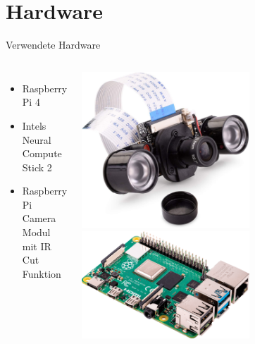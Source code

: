 \section[\thesection \  Hardware]{Hardware}\label{sec:hardware}


\begin{frame}{Verwendete Hardware}
    \begin{columns}[T]

        \begin{itemize}
            \item Raspberry Pi 4
            \item Intels Neural Compute Stick 2
            \item Raspberry Pi Camera Modul mit IR Cut Funktion      
        \end{itemize}
        
        \includegraphics[width=0.6\textwidth]{Bilder/RPiCam.jpg}
        \includegraphics[width=0.6\textwidth]{Bilder/raspberrypi_4.png}

    \end{columns}
        
\end{frame}




